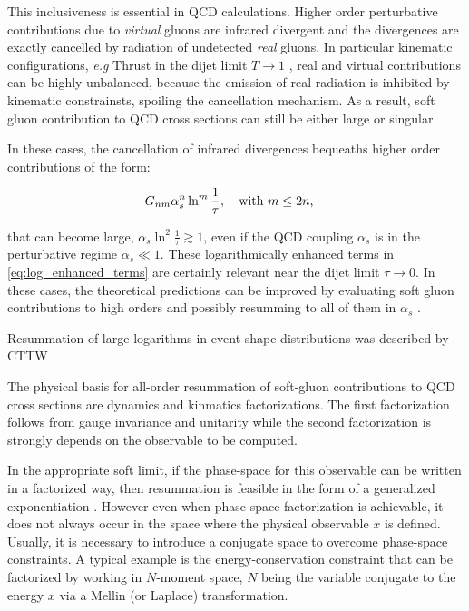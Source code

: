 \documentclass[../main.tex]{subfiles}
\begin{document}
This inclusiveness is essential in QCD calculations. Higher order perturbative contributions due to \emph{virtual}
gluons are infrared divergent and the divergences are exactly  cancelled by radiation of undetected \emph{real} gluons.
In particular kinematic configurations, \emph{e.g} Thrust in the dijet limit $T \to 1$ ,   
real and virtual contributions can be highly unbalanced, because the emission of real radiation is inhibited by kinematic constrainsts,
spoiling the cancellation mechanism. As a result, soft gluon contribution to QCD cross sections can still be either large or singular.

In these cases, the cancellation of infrared divergences bequeaths higher order contributions of the form:

\begin{equation}\label{eq:log_enhanced_terms}
    G_{nm} \alpha_s^n \ln^m \frac{1}{\tau} , \qq{with $m \le 2n $,}
\end{equation}

that can become large, $\alpha_s \ln^2\frac{1}{\tau}\gtrsim 1$, even if the QCD coupling $\alpha_s$ is in the perturbative regime $\alpha_s \ll 1$.
These logarithmically enhanced terms in \cref{eq:log_enhanced_terms} are certainly relevant near the dijet limit $\tau \to 0$.
In these cases, the theoretical predictions can be improved by evaluating soft gluon 
contributions to high orders and possibly resumming to all of them in $\alpha_s$ \cite{CATANI1991491,Monni:2011gb}.

Resummation of large logarithms in event shape distributions was described by CTTW \cite{CATANI19933}. 

The physical basis for all-order resummation of soft-gluon contributions to QCD cross sections are dynamics and kinmatics factorizations. The first factorization follows from 
gauge invariance and unitarity while the second factorization is strongly depends on the observable to be computed.

In the appropriate soft limit, if the phase-space for this observable can be written in a factorized way, then resummation is feasible in the form of a generalized exponentiation \cite{Sterman:1986aj}.
However even when phase-space factorization is achievable, it does
not always occur in the space where the physical observable $x$ is defined.
Usually, it is necessary to introduce a conjugate space to overcome phase-space constraints.
A typical example is the energy-conservation constraint that can be factorized by working in
$N$-moment space, $N$ being the variable conjugate to the energy $x$ via a Mellin (or Laplace)
transformation.
\end{document}
